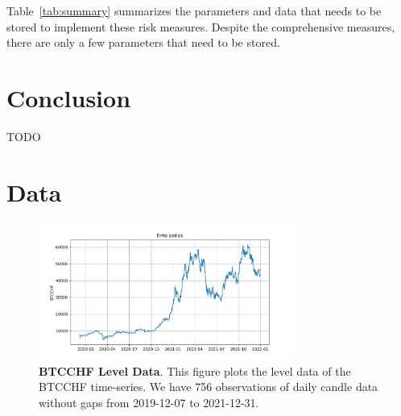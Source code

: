 \documentclass[english,11pt]{article}
\begin{document}
Table~\ref{tab:summary} summarizes the parameters and data that needs to be
stored to implement these risk measures. Despite the comprehensive
measures, there are only a few parameters that need to be stored.

\clearpage
\section{Conclusion}
TODO

\newpage



\clearpage
\appendix
\section{Data}\label{appx:data}
\begin{figure}[h]
    \center
    \includegraphics[width=0.75\textwidth]{time_series.png}
    \caption{\textbf{BTCCHF Level Data}. This figure plots
    the level data of the BTCCHF time-series. 
    We have 756 observations of daily candle data without gaps from 2019-12-07 to
    2021-12-31.}\label{fig:timeseries}
\end{figure}
\end{document}
